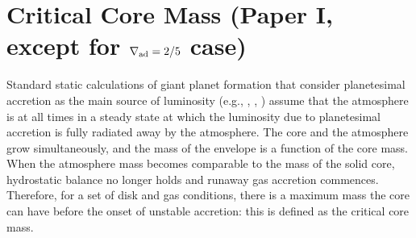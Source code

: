 \documentclass[apj]{emulateapj}
\newcommand{\delad}{\nabla_{\rm ad}}
\begin{document}

\section{Critical Core Mass \textbf{(Paper I, except for $\delad=2/5$ case)}}
\label{critical}


Standard static calculations of giant planet formation that consider planetesimal accretion as the main source of luminosity (e.g., \citealt{mizuno78}, \citealt{stevenson82}, \citealt{rafikov06}) assume that the atmosphere is at all times in a steady state at which the luminosity due to planetesimal accretion is fully radiated away by the atmosphere. The core and the atmosphere grow simultaneously, and the mass of the envelope is a function of the core mass. When the atmosphere mass becomes comparable to the mass of the solid core, hydrostatic balance no longer holds and runaway gas accretion commences. Therefore, for a set of disk and gas conditions, there is a maximum mass the core can have before the onset of unstable accretion: this is defined as the critical core mass. %
\end{document}
